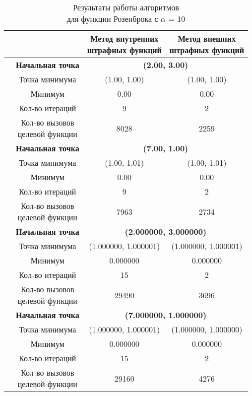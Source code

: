 \begin{table}[H]
        \centering
        \vspace*{-1.5em}
        \caption{Результаты работы алгоритмов\\для функции Розенброка с $\alpha$ = 10}
        \footnotesize
        \begin{tabular}{|c|c|c|c|}
        \hline
        & &\makecell{Метод внутренних\\штрафных функций} &\makecell{Метод внешних\\штрафных функций} \\
        \hline
	\multirow{8}{*}{\rotatebox[origin=c]{90}{$\varepsilon = 0.01$}}&\textbf{Начальная точка} &\multicolumn{2}{c|}{\textbf{(2.00, 3.00)}}\\
	\cline{2-4}
	&Точка минимума &(1.00, 1.00) &(1.00, 1.00) \\ 
	\cline{2-4}
	&Минимум &0.00 &0.00 \\ 
	\cline{2-4}
	&Кол-во итераций &9 &2 \\ 
	\cline{2-4}
	&\makecell{Кол-во вызовов\\целевой функции} &8028 &2259 \\ 
	\cline{2-4}
\cline{2-4}&\textbf{Начальная точка} &\multicolumn{2}{c|}{\textbf{(7.00, 1.00)}}\\
	\cline{2-4}
	&Точка минимума &(1.00, 1.01) &(1.00, 1.01) \\ 
	\cline{2-4}
	&Минимум &0.00 &0.00 \\ 
	\cline{2-4}
	&Кол-во итераций &9 &2 \\ 
	\cline{2-4}
	&\makecell{Кол-во вызовов\\целевой функции} &7963 &2734 \\ 
	\cline{2-4}
	\hline
	\multirow{8}{*}{\rotatebox[origin=c]{90}{$\varepsilon = 1e-06$}}&\textbf{Начальная точка} &\multicolumn{2}{c|}{\textbf{(2.000000, 3.000000)}}\\
	\cline{2-4}
	&Точка минимума &(1.000000, 1.000001) &(1.000000, 1.000001) \\ 
	\cline{2-4}
	&Минимум &0.000000 &0.000000 \\ 
	\cline{2-4}
	&Кол-во итераций &15 &2 \\ 
	\cline{2-4}
	&\makecell{Кол-во вызовов\\целевой функции} &29490 &3696 \\ 
	\cline{2-4}
\cline{2-4}&\textbf{Начальная точка} &\multicolumn{2}{c|}{\textbf{(7.000000, 1.000000)}}\\
	\cline{2-4}
	&Точка минимума &(1.000000, 1.000001) &(1.000000, 1.000000) \\ 
	\cline{2-4}
	&Минимум &0.000000 &0.000000 \\ 
	\cline{2-4}
	&Кол-во итераций &15 &2 \\ 
	\cline{2-4}
	&\makecell{Кол-во вызовов\\целевой функции} &29160 &4276 \\ 
	\cline{2-4}
	\hline

\end{tabular}
\end{table}



